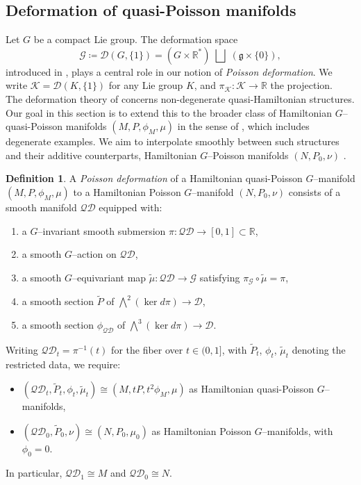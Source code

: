 \documentclass[reqno]{amsart}
\theoremstyle{plain}
\theoremstyle{definition}
\newtheorem{Def}[Thm]{Definition}
\newcommand{\R}{\mathbb{R}}
\newcommand{\too}{\longrightarrow}
\begin{document}
\subsection{Deformation of quasi-Poisson manifolds}

Let $G$ be a compact Lie group. The deformation space
\[
\mathcal{G}\coloneqq \mathcal{D}(G,\{1\})=(G\times\mathbb{R}^{*})\;\bigsqcup\;(\mathfrak{g}\times\{0\}),
\]
introduced in \cite{JMM2025deformations}, plays a central role in our notion of \emph{Poisson deformation}. We write $\mathcal{K}=\mathcal{D}(K,\{1\})$ for any Lie group $K$, and $\pi_{\mathcal{K}}: \mathcal{K} \too \R$ the projection.\\
The deformation theory of \cite{JMM2025deformations} concerns non-degenerate quasi-Hamiltonian structures. Our goal in this section is to extend this to the broader class of Hamiltonian $G$--quasi-Poisson manifolds $(M,P,\phi_{M},\mu)$ in the sense of \cite[]{alekseev2002quasi}, which includes degenerate examples. We aim to interpolate smoothly between such structures and their additive counterparts, Hamiltonian $G$--Poisson manifolds $(N,P_{0},\nu)$ \cite[]{alekseev2002quasi}.

\begin{Def}\label{Def 2.5}
A \emph{Poisson deformation} of a Hamiltonian quasi-Poisson $G$--manifold $(M,P,\phi_{M},\mu)$ to a Hamiltonian Poisson $G$--manifold $(N,P_{0},\nu)$ consists of a smooth manifold $\mathcal{QD}$ equipped with:
\begin{enumerate}
\item a $G$--invariant smooth submersion $\pi:\mathcal{QD}\to[0,1]\subset \R$,
\item a smooth $G$--action on $\mathcal{QD}$,
\item a smooth $G$--equivariant map $\tilde{\mu}:\mathcal{QD}\to\mathcal{G}$ satisfying $\pi_{\mathcal{G}}\circ\tilde{\mu}=\pi$,
\item a smooth section $\tilde{P}$ of $\bigwedge^{2}(\ker d\pi)\to\mathcal{D}$,
\item a smooth section $\phi_{\mathcal{QD}}$ of $\bigwedge^{3}(\ker d\pi)\to\mathcal{D}$.
\end{enumerate}
Writing $\mathcal{QD}_{t}=\pi^{-1}(t)$ for the fiber over $t\in(0,1]$, with $\tilde{P}_{t}$, $\phi_{t}$, $\tilde{\mu}_{t}$ denoting the restricted data, we require:
\begin{itemize}
\item $(\mathcal{QD}_{t},\tilde{P}_{t},\phi_{t},\tilde{\mu}_{t})\cong (M,tP,t^{2}\phi_{M},\mu)$ as Hamiltonian quasi-Poisson $G$--manifolds,
\item $(\mathcal{QD}_{0},\tilde{P}_{0},\nu)\cong (N,P_{0},\mu_{0})$ as Hamiltonian Poisson $G$--manifolds, with $\phi_{0}=0$.
\end{itemize}
In particular, $\mathcal{QD}_{1}\cong M$ and $\mathcal{QD}_{0}\cong N$.
\end{Def}
\end{document}
